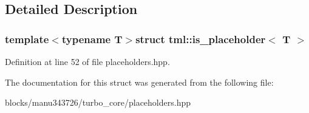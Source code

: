 \subsection{Detailed Description}
\subsubsection*{template$<$typename T$>$struct tml\+::is\+\_\+placeholder$<$ T $>$}



Definition at line 52 of file placeholders.\+hpp.



The documentation for this struct was generated from the following file\+:\begin{DoxyCompactItemize}
\item 
blocks/manu343726/turbo\+\_\+core/placeholders.\+hpp\end{DoxyCompactItemize}
